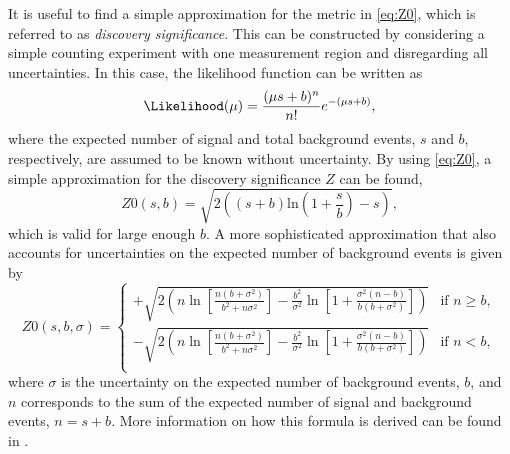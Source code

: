 It is useful to find a simple approximation for the metric in \cref{eq:Z0}, which is referred to as \emph{discovery significance}. 
This can be constructed by considering a simple counting experiment with one measurement region and disregarding all uncertainties. In this case, the likelihood function can be written as
\begin{equation}
  \Likelihood(\mu) = \frac{(\mu s +b)^n}{n!} e^{-(\mu s+b)},
\end{equation}
where the expected number of signal and total background events, $s$ and $b$, respectively, are assumed to be known without uncertainty.
By using \cref{eq:Z0}, a simple approximation for the discovery significance $Z$ can be found,
\begin{equation}
    \label{eq:discovery-significance}
  Z0(s, b) = \sqrt{2 \left( \left(s + b\right) \text{ln}\left(1 + \frac{s}{b}\right) - s\right)},
\end{equation}
which is valid for large enough $b$.
A more sophisticated approximation that also accounts for uncertainties on the expected number of background events is given by
\begin{equation}
    \label{eq:simple-sign}
    Z0(s, b, \sigma) = 
    \begin{cases}
    + \sqrt{ 2 \left( n \ln \left[ \frac{n \left( b + \sigma^2 \right)}{b^2 + n \sigma^2} \right] - \frac{b^2}{\sigma^2} \ln \left[ 1 + \frac{\sigma^2 \left(n - b \right) }{b \left( b + \sigma ^2 \right) } \right] \right)   } & \text{if } n \geq b, \\
    - \sqrt{ 2 \left( n \ln \left[ \frac{n \left( b + \sigma^2 \right)}{b^2 + n \sigma^2} \right] - \frac{b^2}{\sigma^2} \ln \left[ 1 + \frac{\sigma^2 \left(n - b \right) }{b \left( b + \sigma ^2 \right) } \right] \right)   } & \text{if } n < b, \\
\end{cases}
\end{equation}
where $\sigma$ is the uncertainty on the expected number of background events, $b$, and $n$ corresponds to the sum of the expected number of signal and background events, $n = s+b$.
More information on how this formula is derived can be found in .



